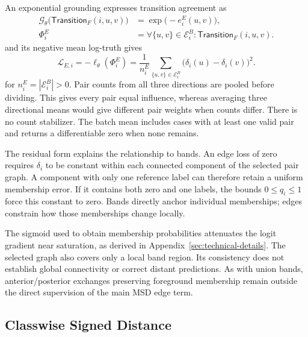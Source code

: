 \documentclass[12pt,a4paper]{article}
\begin{document}
An exponential grounding expresses transition agreement as
\begin{equation}
\begin{aligned}
\mathcal{G}_{\theta}\bigl(\mathsf{Transition}_{F}(i,u,v)\bigr)
 &=\exp\bigl(-e_i^E(u,v)\bigr),\\
\Phi_i^E
 &=\forall\{u,v\}\in\mathcal{E}_i^B:
     \mathsf{Transition}_{F}(i,u,v).
\end{aligned}
\label{eq:edge-logical-statement}
\end{equation}
and its negative mean log-truth gives
\begin{equation}
\mathcal{L}_{E,i}
=-\ell_{\theta}(\Phi_i^E)
=\frac{1}{n_i^E}\sum_{\{u,v\}\in\mathcal{E}_i^B}
   \bigl(\delta_i(u)-\delta_i(v)\bigr)^2.
\label{eq:edge-case-loss}
\end{equation}
for $n_i^E=|\mathcal E_i^B|>0$. Pair counts from all three directions
are pooled before dividing. This gives every pair equal influence,
whereas averaging three directional means would give different pair
weights when counts differ. There is no count stabilizer. The batch
mean includes cases with at least one valid pair and returns a
differentiable zero when none remains.

The residual form explains the relationship to bands. An edge loss of
zero requires $\delta_i$ to be constant within each connected component
of the selected pair graph. A component with only one reference label
can therefore retain a uniform membership error. If it contains both
zero and one labels, the bounds $0\leq q_i\leq1$ force this constant
to zero. Bands directly anchor individual memberships; edges constrain
how those memberships change locally.

The sigmoid used to obtain membership probabilities attenuates the
logit gradient near saturation, as derived in
Appendix~\ref{sec:technical-details}. The selected graph also covers
only a local band region. Its consistency does not establish global
connectivity or correct distant predictions. As with union bands,
anterior/posterior exchanges preserving foreground membership remain
outside the direct supervision of the main MSD edge term.

\subsection{Classwise Signed Distance}\label{sec:sdf-constraints}
\end{document}
